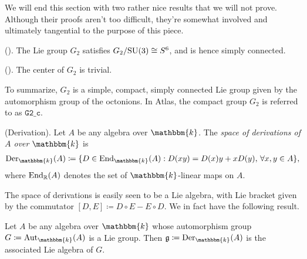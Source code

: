 \noindent We will end this section with two rather nice results that we will not prove. Although their proofs aren't too difficult, they're somewhat involved and ultimately tangential to the purpose of this piece.\\

\noindent\begin{theorem}\textup{(\cite[Theorem 1.9.2, Theorem 1.9.3]{Yok25}).}\label{SimplyConnected} The Lie group $G_2$ satisfies $G_2/\textup{SU}(3) \cong S^6$, and is hence simply connected.\\
\end{theorem}

\noindent\begin{theorem}\textup{(\cite[Theorem 1.11.1]{Yok25}).}\label{TrivialCenter} The center of $G_2$ is trivial.\\
\end{theorem}

\noindent To summarize, $G_2$ is a simple, compact, simply connected Lie group given by the automorphism group of the octonions. In Atlas, the compact group $G_2$ is referred to as $\texttt{G2\_c}$.\\[\linespacing]

\noindent\begin{definition}\textup{(Derivation).}\label{Derivation} Let $A$ be any algebra over $\mathbbm{k}$. The {\em space of derivations of $A$ over $\mathbbm{k}$} is
\begin{align*}
\begin{split}
\textup{Der}_\mathbbm{k}(A) \coloneqq \{D \in \textup{End}_\mathbbm{k}(A) : D(xy) = D(x)y + xD(y),\ \!\forall x, y \in A\},
\end{split}
\end{align*}
\noindent where $\textup{End}_\mathbb{R}(A)$ denotes the set of $\mathbbm{k}$-linear maps on $A$.\\
\end{definition}

\noindent The space of derivations is easily seen to be a Lie algebra, with Lie bracket given by the commutator $[D, E] \coloneqq D \circ E - E \circ D$. We in fact have the following result.\\

\noindent\begin{theorem}\label{DerivationAutomorphism} Let $A$ be any algebra over $\mathbbm{k}$ whose automorphism group $G \coloneqq \textup{Aut}_\mathbbm{k}(A)$ is a Lie group. Then $\mathfrak{g} \coloneqq \textup{Der}_\mathbbm{k}(A)$ is the associated Lie algebra of $G$.\\
\end{theorem}

